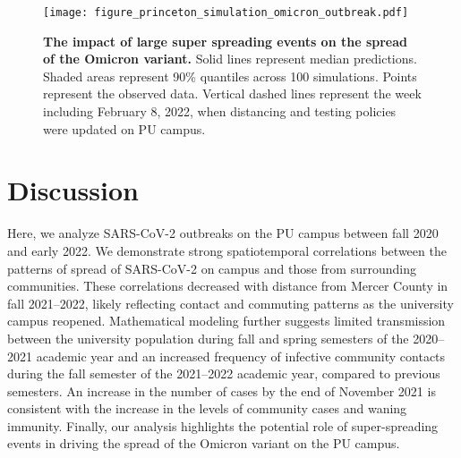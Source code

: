 \documentclass[12pt]{article}
\begin{document}
\begin{figure}[!thp]
\texttt{[image: figure\_princeton\_simulation\_omicron\_outbreak.pdf]}
\caption{
\textbf{The impact of large super spreading events on the spread of the Omicron variant.}
Solid lines represent median predictions.
Shaded areas represent 90\% quantiles across 100 simulations.
Points represent the observed data.
Vertical dashed lines represent the week including February 8, 2022, when distancing and testing policies were updated on PU campus.
}
\label{fig:omicron2}
\end{figure}

\section*{Discussion}

Here, we analyze SARS-CoV-2 outbreaks on the PU campus between fall 2020 and early 2022.
We demonstrate strong spatiotemporal correlations between the patterns of spread of SARS-CoV-2 on campus and those from surrounding communities.
These correlations decreased with distance from Mercer County in fall 2021--2022, likely reflecting contact and commuting patterns as the university campus reopened.
Mathematical modeling further suggests limited transmission between the university population during fall and spring semesters of the 2020--2021 academic year and an increased frequency of infective community contacts during the fall semester of the 2021--2022 academic year, compared to previous semesters.
An increase in the number of cases by the end of November 2021 is consistent with the increase in the levels of community cases and waning immunity.
Finally, our analysis highlights the potential role of super-spreading events in driving the spread of the Omicron variant on the PU campus.
\end{document}
